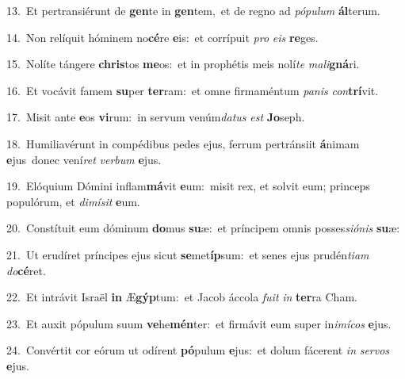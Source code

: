 {\numbfont\textcolor{\numbcolor}{13.}}~Et pertransiérunt de \textbf{gen}\-te in \textbf{gen}\-tem,~\star et de regno ad \textit{pó}\-\textit{pu}\textit{lum} \textbf{ál}\-terum.\par
{\numbfont\textcolor{\numbcolor}{14.}}~Non relíquit hóminem no\-\textbf{cé}\-re \textbf{e}\-is:~\star et corrípuit \textit{pro} \textit{e}\-\textit{is} \textbf{re}\-ges.\par
{\numbfont\textcolor{\numbcolor}{15.}}~Nolíte tángere \textbf{chris}\-tos \textbf{me}\-os:~\star et in prophétis meis nolí\textit{te} \textit{ma}\-\textit{li}\textbf{gná}ri.\par
{\numbfont\textcolor{\numbcolor}{16.}}~Et vocávit famem \textbf{su}\-per \textbf{ter}\-ram:~\star et omne firmaméntum \textit{pa}\-\textit{nis} \textit{con}\-\textbf{trí}vit.\par
{\numbfont\textcolor{\numbcolor}{17.}}~Misit ante \textbf{e}\-os \textbf{vi}\-rum:~\star in servum venúm\-\textit{da}\-\textit{tus} \textit{est} \textbf{Jo}\-seph.\par
{\numbfont\textcolor{\numbcolor}{18.}}~Humiliavérunt in compédibus pedes ejus, ferrum pertránsiit \textbf{á}\-nimam \textbf{e}\-jus~\star donec vení\textit{ret} \textit{ver}\-\textit{bum} \textbf{e}\-jus.\par
{\numbfont\textcolor{\numbcolor}{19.}}~Elóquium Dómini inflam\-\textbf{má}\-vit \textbf{e}\-um:~\star misit rex, et solvit eum; princeps populórum, et \textit{di}\-\textit{mí}\textit{sit} \textbf{e}\-um.\par
{\numbfont\textcolor{\numbcolor}{20.}}~Constítuit eum dóminum \textbf{do}\-mus \textbf{su}\-æ:~\star et príncipem omnis posses\-\textit{si}\-\textit{ó}\textit{nis} \textbf{su}\-æ:\par
{\numbfont\textcolor{\numbcolor}{21.}}~Ut erudíret príncipes ejus sicut \textbf{se}\-met\-\textbf{íp}\-sum:~\star et senes ejus prudén\-\textit{ti}\-\textit{am} \textit{do}\-\textbf{cé}ret.\par
{\numbfont\textcolor{\numbcolor}{22.}}~Et intrávit Israël \textbf{in} Æ\-\textbf{gýp}\-tum:~\star et Jacob áccola \textit{fu}\-\textit{it} \textit{in} \textbf{ter}\-ra Cham.\par
{\numbfont\textcolor{\numbcolor}{23.}}~Et auxit pópulum suum \textbf{ve}\-he\-\textbf{mén}\-ter:~\star et firmávit eum super in\-\textit{i}\-\textit{mí}\textit{cos} \textbf{e}\-jus.\par
{\numbfont\textcolor{\numbcolor}{24.}}~Convértit cor eórum ut odírent \textbf{pó}\-pulum \textbf{e}\-jus:~\star et dolum fácerent \textit{in} \textit{ser}\-\textit{vos} \textbf{e}\-jus.\par
